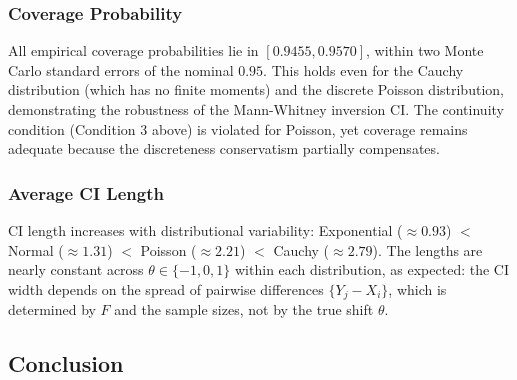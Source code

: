 \documentclass[10pt]{article}
\begin{document}
\subsubsection{Coverage Probability}

All empirical coverage probabilities lie in $[0.9455, 0.9570]$, within two Monte Carlo standard errors of the nominal $0.95$. This holds even for the Cauchy distribution (which has no finite moments) and the discrete Poisson distribution, demonstrating the robustness of the Mann-Whitney inversion CI. The continuity condition (Condition 3 above) is violated for Poisson, yet coverage remains adequate because the discreteness conservatism partially compensates.

\subsubsection{Average CI Length}

CI length increases with distributional variability: Exponential ($\approx 0.93$) $<$ Normal ($\approx 1.31$) $<$ Poisson ($\approx 2.21$) $<$ Cauchy ($\approx 2.79$). The lengths are nearly constant across $\theta \in \{-1, 0, 1\}$ within each distribution, as expected: the CI width depends on the spread of pairwise differences $\{Y_j - X_i\}$, which is determined by $F$ and the sample sizes, not by the true shift $\theta$.

\subsection{Conclusion}
\end{document}
